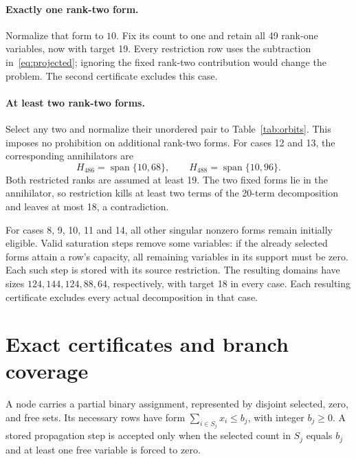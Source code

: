 \documentclass[11pt]{article}
\theoremstyle{definition}
\begin{document}
\paragraph{Exactly one rank-two form.}
Normalize that form to $10$. Fix its count to one and retain all 49 rank-one variables, now with target 19. Every restriction row uses the subtraction in~\eqref{eq:projected}; ignoring the fixed rank-two contribution would change the problem. The second certificate excludes this case.

\paragraph{At least two rank-two forms.}
Select any two and normalize their unordered pair to Table~\ref{tab:orbits}. This imposes no prohibition on additional rank-two forms. For cases 12 and 13, the corresponding annihilators are
\[
 H_{486}=\operatorname{span}\{10,68\},\qquad
 H_{488}=\operatorname{span}\{10,96\}.
\]
Both restricted ranks are assumed at least 19. The two fixed forms lie in the annihilator, so restriction kills at least two terms of the 20-term decomposition and leaves at most 18, a contradiction.

For cases 8, 9, 10, 11 and 14, all other singular nonzero forms remain initially eligible. Valid saturation steps remove some variables: if the already selected forms attain a row's capacity, all remaining variables in its support must be zero. Each such step is stored with its source restriction. The resulting domains have sizes $124,144,124,88,64$, respectively, with target 18 in every case. Each resulting certificate excludes every actual decomposition in that case.

\section{Exact certificates and branch coverage}\label{sec:certificates}
A node carries a partial binary assignment, represented by disjoint selected, zero, and free sets. Its necessary rows have form
$\sum_{i\in S_j}x_i\leq b_j$, with integer $b_j\geq0$. A stored propagation step is accepted only when the selected count in $S_j$ equals $b_j$ and at least one free variable is forced to zero.
\end{document}
